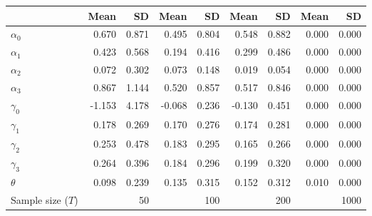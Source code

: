 
\begin{tabular}[t]{lrrrrrrrr}
\toprule
  & Mean & SD & Mean  & SD  & Mean   & SD   & Mean    & SD   \\
\midrule
$\alpha_{0}$ & 0.670 & 0.871 & 0.495 & 0.804 & 0.548 & 0.882 & 0.000 & 0.000\\
$\alpha_{1}$ & 0.423 & 0.568 & 0.194 & 0.416 & 0.299 & 0.486 & 0.000 & 0.000\\
$\alpha_{2}$ & 0.072 & 0.302 & 0.073 & 0.148 & 0.019 & 0.054 & 0.000 & 0.000\\
$\alpha_{3}$ & 0.867 & 1.144 & 0.520 & 0.857 & 0.517 & 0.846 & 0.000 & 0.000\\
$\gamma_{0}$ & -1.153 & 4.178 & -0.068 & 0.236 & -0.130 & 0.451 & 0.000 & 0.000\\
$\gamma_{1}$ & 0.178 & 0.269 & 0.170 & 0.276 & 0.174 & 0.281 & 0.000 & 0.000\\
$\gamma_{2}$ & 0.253 & 0.478 & 0.183 & 0.295 & 0.165 & 0.266 & 0.000 & 0.000\\
$\gamma_{3}$ & 0.264 & 0.396 & 0.184 & 0.296 & 0.199 & 0.320 & 0.000 & 0.000\\
$\theta$ & 0.098 & 0.239 & 0.135 & 0.315 & 0.152 & 0.312 & 0.010 & 0.000\\
Sample size ($T$) &  & 50 &  & 100 &  & 200 &  & 1000\\
\bottomrule
\end{tabular}
